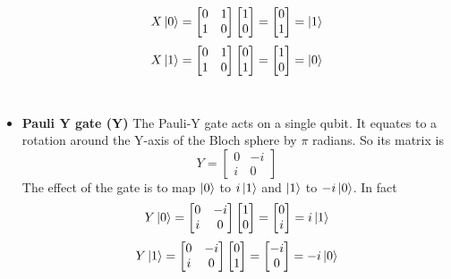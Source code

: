 \documentclass[main.tex]{subfiles}
\begin{document}
\begin{itemize}
	$$
	X\ket{0}=
	\begin{bmatrix}
	0 & 1\\
	1 & 0
	\end{bmatrix}
	\begin{bmatrix}
	1 \\
	0
	\end{bmatrix}
	=
	\begin{bmatrix}
	0 \\
	1
	\end{bmatrix}
	=\ket{1}
	$$
	$$
	X\ket{1}=
	\begin{bmatrix}
	0 & 1\\
	1 & 0
	\end{bmatrix}
	\begin{bmatrix}
	0 \\
	1
	\end{bmatrix}
	=
	\begin{bmatrix}
	1 \\
	0
	\end{bmatrix}
	=\ket{0}
	$$\\
	
	\item \textbf{Pauli Y gate (Y)} The Pauli-Y gate acts on a single qubit. It equates to a rotation around the Y-axis of the Bloch sphere by $\pi$ radians. So its matrix is 
	\begin{equation}
	Y=
	\begin{bmatrix}
	0 & -i\\
	i & 0
	\end{bmatrix}
	\end{equation}
	The effect of the gate is to map
	$\ket{0}$ to $i\ket{1}$ and 
	$\ket{1}$ to $-i\ket{0}$. In fact
	$$
	Y\ket{0}=
	\begin{bmatrix}
	0 & -i\\
	i & 0
	\end{bmatrix}
	\begin{bmatrix}
	1 \\
	0
	\end{bmatrix}
	=
		\begin{bmatrix}
	0 \\
	i
	\end{bmatrix}
	=
	i\ket{1}
	$$
	$$
	Y\ket{1}=
	\begin{bmatrix}
	0 & -i\\
	i & 0
	\end{bmatrix}
	\begin{bmatrix}
	0 \\
	1
	\end{bmatrix}
	=
		\begin{bmatrix}
	-i \\
	0
	\end{bmatrix}
	=
	-i\ket{0}
	$$\\
	

\end{itemize}
\end{document}
